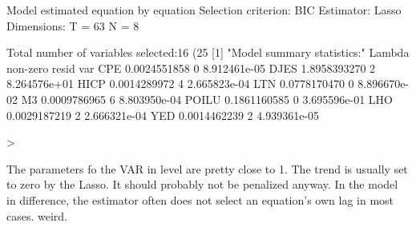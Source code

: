\documentclass[11pt,oneside, a4paper]{amsart}
\begin{document}
\begin{Schunk}
\begin{Soutput}
Model estimated equation by equation
Selection criterion: BIC
Estimator: Lasso
Dimensions: T = 63  N = 8

Total number of variables selected:16 (25% of candidates)
[1] "Model summary statistics:"
            Lambda non-zero    resid var
CPE   0.0024551858        0 8.912461e-05
DJES  1.8958393270        2 8.264576e+01
HICP  0.0014289972        4 2.665823e-04
LTN   0.0778170470        0 8.896670e-02
M3    0.0009786965        6 8.803950e-04
POILU 0.1861160585        0 3.695596e-01
LHO   0.0029187219        2 2.666321e-04
YED   0.0014462239        2 4.939361e-05
\end{Soutput}
\begin{Sinput}
> 
\end{Sinput}
\end{Schunk}


\begin{Schunk}
\end{Schunk}


The parameters fo the VAR in level are pretty close to 1. The trend is usually set to zero by the Lasso. It should probably not be penalized anyway. In the model in difference, the estimator often does not select an equation's own lag in most cases. weird. 
\end{document}
